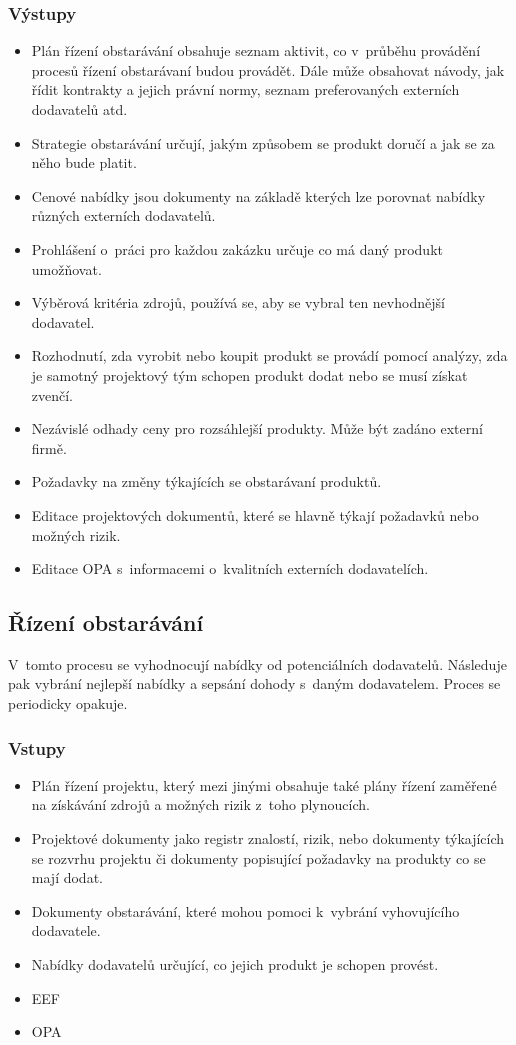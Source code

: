 \subsubsection*{Výstupy}
\begin{itemize}
    \item Plán řízení obstarávání obsahuje seznam aktivit, co v~průběhu provádění procesů řízení obstarávaní budou provádět. Dále může obsahovat návody, jak řídit kontrakty a jejich právní normy, seznam preferovaných externích dodavatelů atd. 
    \item Strategie obstarávání určují, jakým způsobem se produkt doručí a jak se za něho bude platit.
    \item Cenové nabídky jsou dokumenty na základě kterých lze porovnat nabídky různých externích dodavatelů.
    \item Prohlášení o~práci pro každou zakázku určuje co má daný produkt umožňovat.
    \item Výběrová kritéria zdrojů, používá se, aby se vybral ten nevhodnější dodavatel.
    \item Rozhodnutí, zda vyrobit nebo koupit produkt se provádí pomocí analýzy, zda je samotný projektový tým schopen produkt dodat nebo se musí získat zvenčí.
    \item Nezávislé odhady ceny pro rozsáhlejší produkty. Může být zadáno externí firmě.
    \item Požadavky na změny týkajících se obstarávaní produktů.
    \item Editace projektových dokumentů, které se hlavně týkají požadavků nebo možných rizik.
    \item Editace OPA s~informacemi o~kvalitních externích dodavatelích.
\end{itemize}

\subsection*{Řízení obstarávání}

V~tomto procesu se vyhodnocují nabídky od potenciálních dodavatelů. Následuje pak vybrání nejlepší nabídky a sepsání dohody s~daným dodavatelem. Proces se periodicky opakuje.

\subsubsection*{Vstupy}
\begin{itemize}
    \item Plán řízení projektu, který mezi jinými obsahuje také plány řízení zaměřené na získávání zdrojů a možných rizik z~toho plynoucích.
    \item Projektové dokumenty jako registr znalostí, rizik, nebo dokumenty týkajících se rozvrhu projektu či dokumenty popisující požadavky na produkty co se mají dodat.
    \item Dokumenty obstarávání, které mohou pomoci k~vybrání vyhovujícího dodavatele.
    \item Nabídky dodavatelů určující, co jejich produkt je schopen provést.
    \item EEF
    \item OPA
\end{itemize}
